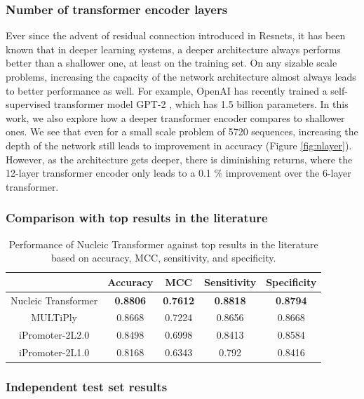 \documentclass{article}
\begin{document}
\subsubsection{Number of transformer encoder layers}
Ever since the advent of residual connection introduced in Resnets\cite{resnetpaper1}, it has been known that in deeper learning systems, a deeper architecture always performs better than a shallower one, at least on the training set. On any sizable scale problems, increasing the capacity of the network architecture almost always leads to better performance as well. For example, OpenAI has recently trained a self-supervised transformer model GPT-2 \cite{GPT2}, which has 1.5 billion parameters. In this work, we also explore how a deeper transformer encoder compares to shallower ones. We see that even for a small scale problem of 5720 sequences, increasing the depth of the network still leads to improvement in accuracy (Figure \ref{fig:nlayer}). However, as the architecture gets deeper, there is diminishing returns, where the 12-layer transformer encoder only leads to a 0.1 \% improvement over the 6-layer transformer. 



\subsubsection{Comparison with top results in the literature}
\begin{table}[h]
\center
\begin{tabular}{@{}ccccc@{}}
\toprule
                    & Accuracy        & MCC             & Sensitivity     & Specificity     \\ \midrule
Nucleic Transformer & \textbf{0.8806} & \textbf{0.7612} & \textbf{0.8818} & \textbf{0.8794} \\
MULTiPly            & 0.8668          & 0.7224          & 0.8656          & 0.8668          \\
iPromoter-2L2.0     & 0.8498          & 0.6998          & 0.8413          & 0.8584          \\
iPromoter-2L1.0     & 0.8168          & 0.6343          & 0.792           & 0.8416          \\ \bottomrule
\end{tabular}
\caption{Performance of Nucleic Transformer against top results in the literature based on accuracy, MCC, sensitivity, and specificity.}
\label{tab:comparison}
\end{table}

\subsubsection{Independent test set results}
\end{document}
